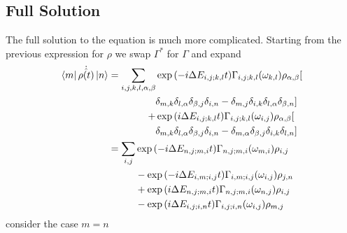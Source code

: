 \subsection{Full Solution}\label{sec:redfield equation full solution}
The full solution to the equation is
much more complicated. Starting from the
previous expression for \(\rho \) we
swap \(\Gamma^*\) for \(\Gamma \) and expand
\begin{align}
    \bra{m}\dot{\hat{\rho{}(t)}} \ket{n} & = \begin{aligned}[t]
        \sum_{i,j,k, l, \alpha, \beta} &
        \exp{(-i\Delta{}E_{i,j;k,l}t)}
        \Gamma_{i,j;k, l}(\omega_{k,l})
        \rho_{\alpha, \beta} [               \\ &
            \delta_{m, k}\delta_{l, \alpha}
            \delta_{\beta, j}\delta_{i, n}
            -\delta_{m, j}\delta_{i, k}
        \delta_{l, \alpha}\delta_{\beta, n}] \\
        +                              &
        \exp{(i\Delta{}E_{i,j;k,l} t)}
        \Gamma_{i,j; k, l}(\omega_{i,j})
        \rho_{\alpha, \beta} [               \\ &
            \delta_{m, k}\delta_{l, \alpha}
            \delta_{\beta, j}\delta_{i, n}
            - \delta_{m, \alpha}\delta_{\beta, j}
            \delta_{i, k}\delta_{l, n}]
    \end{aligned}                                   \\
                                         & = \begin{aligned}[t]
        \sum_{i,j} &
        \exp{(-i\Delta{}E_{n,j;m,i} t)}
        \Gamma_{n,j;m, i}(\omega_{m,i})
        \rho_{i,j}   \\
                   &
        -\exp{(-i\Delta{}E_{i,m;i,j} t)}
        \Gamma_{i,m;i, j}(\omega_{i,j})
        \rho_{j, n}  \\
                   &
        +\exp{(i\Delta{}E_{n,j;m,i} t)}
        \Gamma_{n,j; m, i}(\omega_{n,j})
        \rho_{i, j}  \\
                   &
        -\exp{(i\Delta{}E_{i,j;i,n} t)}
        \Gamma_{i,j; i, n}(\omega_{i,j})
        \rho_{m, j}
    \end{aligned}\label{eqn:full redfield solution}
\end{align}
consider the case \(m=n\)
